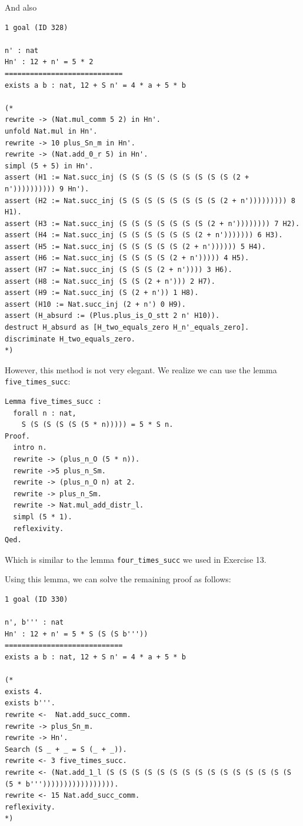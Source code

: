\documentclass{article}
\begin{document}
And also 

\begin{lstlisting}
1 goal (ID 328)

n' : nat
Hn' : 12 + n' = 5 * 2
============================
exists a b : nat, 12 + S n' = 4 * a + 5 * b

(* 
rewrite -> (Nat.mul_comm 5 2) in Hn'.
unfold Nat.mul in Hn'.
rewrite -> 10 plus_Sn_m in Hn'.           
rewrite -> (Nat.add_0_r 5) in Hn'.
simpl (5 + 5) in Hn'.
assert (H1 := Nat.succ_inj (S (S (S (S (S (S (S (S (S (2 + n')))))))))) 9 Hn').
assert (H2 := Nat.succ_inj (S (S (S (S (S (S (S (S (2 + n'))))))))) 8 H1).
assert (H3 := Nat.succ_inj (S (S (S (S (S (S (S (2 + n')))))))) 7 H2).
assert (H4 := Nat.succ_inj (S (S (S (S (S (S (2 + n'))))))) 6 H3).
assert (H5 := Nat.succ_inj (S (S (S (S (S (2 + n')))))) 5 H4).
assert (H6 := Nat.succ_inj (S (S (S (S (2 + n'))))) 4 H5).
assert (H7 := Nat.succ_inj (S (S (S (2 + n')))) 3 H6).
assert (H8 := Nat.succ_inj (S (S (2 + n'))) 2 H7).
assert (H9 := Nat.succ_inj (S (2 + n')) 1 H8).
assert (H10 := Nat.succ_inj (2 + n') 0 H9).
assert (H_absurd := (Plus.plus_is_O_stt 2 n' H10)).
destruct H_absurd as [H_two_equals_zero H_n'_equals_zero].
discriminate H_two_equals_zero.
*)
\end{lstlisting}

However, this method is not very elegant. We realize we can use the lemma \texttt{five\_times\_succ}:

\begin{lstlisting}
Lemma five_times_succ :
  forall n : nat,
    S (S (S (S (S (5 * n))))) = 5 * S n.
Proof.
  intro n.
  rewrite -> (plus_n_O (5 * n)).
  rewrite ->5 plus_n_Sm.
  rewrite -> (plus_n_O n) at 2.
  rewrite -> plus_n_Sm.
  rewrite -> Nat.mul_add_distr_l.
  simpl (5 * 1).
  reflexivity.
Qed.
\end{lstlisting}

Which is similar to the lemma \texttt{four\_times\_succ} we used in Exercise 13.

Using this lemma, we can solve the remaining proof as follows:

\begin{lstlisting}
1 goal (ID 330)

n', b''' : nat
Hn' : 12 + n' = 5 * S (S (S b'''))
============================
exists a b : nat, 12 + S n' = 4 * a + 5 * b

(* 
exists 4.
exists b'''.
rewrite <-  Nat.add_succ_comm.
rewrite -> plus_Sn_m.
rewrite -> Hn'.
Search (S _ + _ = S (_ + _)).
rewrite <- 3 five_times_succ.
rewrite <- (Nat.add_1_l (S (S (S (S (S (S (S (S (S (S (S (S (S (S (S (5 * b'''))))))))))))))))).
rewrite <- 15 Nat.add_succ_comm.
reflexivity.
*)
\end{lstlisting}
\end{document}

